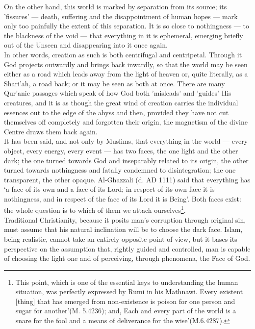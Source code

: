 \documentclass[10pt, twoside,openright]{book}
\begin{document}
On the other hand, this world is marked by separation from its source; its 'fissures' --- death, 
suffering and the disappointment of human hopes --- mark only too painfully the extent of this 
separation. It is so close to nothingness --- to the blackness of the void --- that everything in it is 
ephemeral, emerging briefly out of the Unseen and disappearing into it once again. \\

In other words, creation as such is both centrifugal and centripetal. Through it God projects 
outwardly and brings back inwardly, so that the world may be seen either as a road which leads away 
from the light of heaven or, quite literally, as a Shari'ah, a road back; or it may be seen as both 
at once. There are many Qur'anic passages which speak of how God both 'misleads' and 'guides' His 
creatures, and it is as though the great wind of creation carries the individual essences out to the 
edge of the abyss and then, provided they have not cut themselves off completely and forgotten their 
origin, the magnetism of the divine Centre draws them back again. \\

It has been said, and not only by Muslims, that everything in the world --- every object, every energy, 
every event --- has two faces, the one light and the other dark; the one turned towards God and 
inseparably related to its origin, the other turned towards nothingness and fatally condemned to 
disintegration; the one transparent, the other opaque. Al\hyp{}Ghazzali (d. AD 1111) said that everything 
has `a face of its own and a face of its Lord; in respect of its own face it is nothingness, and in 
respect of the face of its Lord it is Being'. Both faces exist: the whole question is to which of 
them we attach ourselves\footnote{This point, which is one of the essential keys to understanding the human situation, was perfectly expressed by Rumi in his Mathnawi. Every existent [thing] that has emerged from non\hyp{}existence is poison for one person and sugar for another'(M. 5.4236); and, Each and every part of the world is a snare for the fool and a means of deliverance for the wise'(M.6.4287).}.\\

Traditional Christianity, because it posits man's corruption through original sin, must assume that 
his natural inclination will be to choose the dark face. Islam, being realistic, cannot take an 
entirely opposite point of view, but it bases its perspective on the assumption that, rightly guided 
and controlled, man is capable of choosing the light one and of perceiving, through phenomena, the 
Face of God. \\
\end{document}
